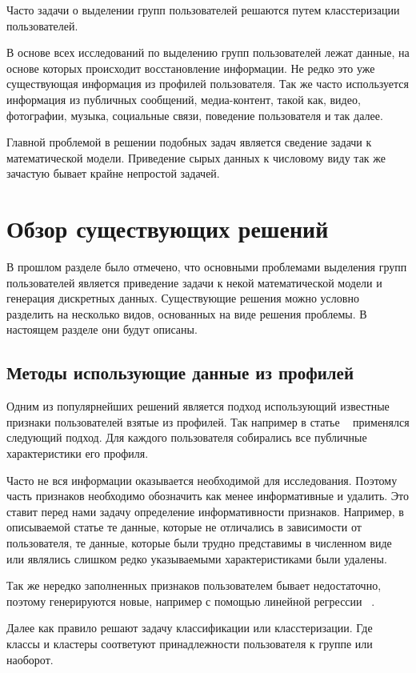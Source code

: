 \documentclass[annotation,times,page4]{itmo-student-thesis}
\begin{document}
Часто задачи о выделении групп пользователей решаются путем класстеризации пользователей.

В основе всех исследований по выделению групп пользователей лежат данные, на основе которых происходит восстановление информации. Не редко это уже существующая информация из профилей пользователя. Так же часто используется информация из публичных сообщений, медиа-контент, такой как, видео, фотографии, музыка, социальные связи, поведение пользователя и так далее.

Главной проблемой в решении подобных задач является сведение задачи к математической модели. Приведение сырых данных к числовому виду так же зачастую бывает крайне непростой задачей.
  
\section{Обзор существующих решений}
В прошлом разделе было отмечено, что основными проблемами выделения групп пользователей является приведение задачи к некой математической модели и генерация дискретных данных. Существующие решения можно условно разделить на несколько видов, основанных на виде решения проблемы. В настоящем разделе они будут описаны.
\subsection{Методы использующие данные из профилей}
Одним из популярнейших решений является подход использующий известные признаки пользователей взятые из профилей. Так например в статье ~\cite{golbeck2011predicting} применялся следующий подход. Для каждого пользователя собирались все публичные характеристики его профиля. 

Часто не вся информации оказывается необходимой для исследования. Поэтому часть признаков необходимо обозначить как менее информативные и удалить. Это ставит перед нами задачу определение информативности признаков. Например, в описываемой статье те данные, которые не отличались в зависимости от пользователя, те данные, которые были трудно представимы в численном виде или являлись слишком редко указываемыми характеристиками были удалены.
 
Так же нередко заполненных признаков пользователем бывает недостаточно, поэтому генерируются новые, например с помощью линейной регрессии ~\cite{golbeck2011predicting}.

Далее как правило решают задачу классификации или класстеризации. Где классы и кластеры соответуют принадлежности пользователя к группе или наоборот.
\end{document}
